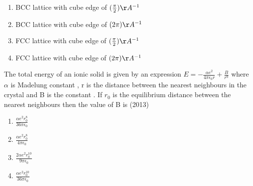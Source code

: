  
			\begin{enumerate}
   \item BCC lattice with cube edge of $(\frac{\pi}{2}) \AA^{-1}$
\item BCC lattice with cube edge of $(2 \pi) \AA^{-1}$
\item FCC lattice with cube edge of $(\frac{\pi}{2}) \AA^{-1}$
\item FCC lattice with cube edge of $(2 \pi) \AA^{-1}$
			\end{enumerate}
\item The total energy of an ionic solid is given by an expression $E=-\frac{\alpha e^2}{4\pi\epsilon_0r}+\frac{B}{r^9}$ where $\alpha$ is Madelung constant , r is the distance between the nearest neighbours in the crystal and B is the constant . If $r_0$ is the equilibrium distance between the nearest neighbours then the value of B is \hfill{(2013)}

\begin{enumerate}
	\item $\frac{\alpha e^2 r_0^8}{36\pi \epsilon_0}$
	\item$\frac{\alpha e^2 r_0^8}{4\pi \epsilon_0}$
	\item$\frac{2\alpha e^2 r_0^10}{9\pi \epsilon_0}$
	\item$\frac{\alpha e^2 r_0^10}{36\pi \epsilon_0}$


  \end{enumerate}
		
